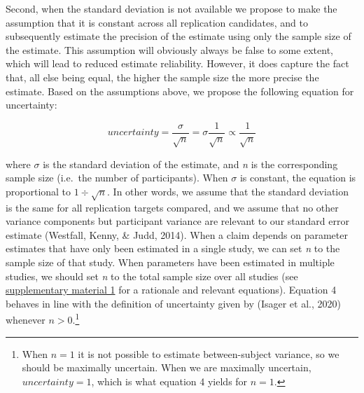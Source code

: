 \documentclass[
  english,
  jou,floatsintext]{apa6}
\begin{document}
Second, when the standard deviation is not available we propose to make the assumption that it is constant across all replication candidates, and to subsequently estimate the precision of the estimate using only the sample size of the estimate. This assumption will obviously always be false to some extent, which will lead to reduced estimate reliability. However, it does capture the fact that, all else being equal, the higher the sample size the more precise the estimate. Based on the assumptions above, we propose the following equation for uncertainty:

\begin{equation} 
  \tag{5}
  uncertainty=\frac{\sigma}{\sqrt{n}}=\sigma\frac{1}{\sqrt{n}}\propto\frac{1}{\sqrt{n}}
  \label{eq:5}
\end{equation}

where \(\sigma\) is the standard deviation of the estimate, and \emph{n} is the corresponding sample size (i.e.~the number of participants). When \(\sigma\) is constant, the equation is proportional to \(1\div\sqrt{n}\). In other words, we assume that the standard deviation is the same for all replication targets compared, and we assume that no other variance components but participant variance are relevant to our standard error estimate (Westfall, Kenny, \& Judd, 2014). When a claim depends on parameter estimates that have only been estimated in a single study, we can set \emph{n} to the sample size of that study. When parameters have been estimated in multiple studies, we should set \emph{n} to the total sample size over all studies (see \href{https://osf.io/rdhw3/}{supplementary material 1} for a rationale and relevant equations). Equation 4 behaves in line with the definition of uncertainty given by (Isager et al., 2020) whenever \(n>0\).\footnote{When \(n=1\) it is not possible to estimate between-subject variance, so we should be maximally uncertain. When we are maximally uncertain, \(uncertainty=1\), which is what equation 4 yields for \(n=1\).}
\end{document}

